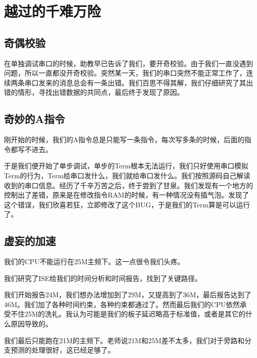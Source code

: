 \section{越过的千难万险}

\subsection{奇偶校验}

在单独调试串口的时候，助教早已告诉了我们，要开奇校验。由于我们一直没遇到问题，所以一直都没开奇校验。突然某一天，我们的串口突然不能正常工作了，连续两条串口发来的消息总会有一条出错。我们百思不得其解，我们仔细研究了其出错的情形，寻找出错数据的共同点，最后终于发现了原因。

\subsection{奇妙的A指令}

刚开始的时候，我们的A指令总是只能写一条指令，每次写多条的时候，后面的指令都写不进去。

于是我们便开始了单步调试，单步的Term根本无法运行，我们只好使用串口模拟Term的行为，Term给串口发什么，我们就给串口发什么。我们按照源码自己解读收到的串口信息。经历了千辛万苦之后，终于尝到了甘泉。我们发现有一个地方的控制出了差错，原来是在修改指令RAM的时候，有一种情况没有插气泡。发现了这个错误，我们欣喜若狂，立即修改了这个BUG，于是我们的Term算是可以运行了。

\subsection{虚妄的加速}

我们的CPU不能运行在25M主频下。这一点很令我们头疼。

我们研究了ISE给我们的时间分析和时间报告，找到了关键路径。

我们开始报告24M，我们想办法增加到了29M，又提高到了36M，最后报告达到了46M。我们加了各种时间约束，各种约束都通过了。然而最后我们的CPU依然承受不住25M的洗礼。我认为可能是我们的板子延迟略高于标准值，或者是其它的什么原因导致的。

我们最后只能跑在21M的主频下。老师说21M和25M差不太多，我们对于旁路和分支预测的处理很好，这已经足够了。

